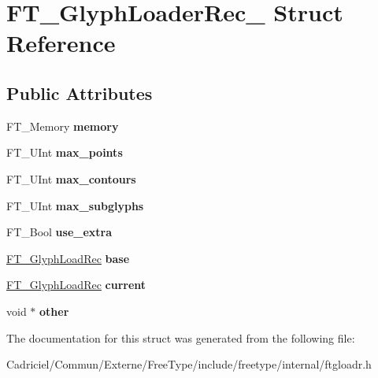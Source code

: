 \hypertarget{struct_f_t___glyph_loader_rec__}{\section{F\-T\-\_\-\-Glyph\-Loader\-Rec\-\_\- Struct Reference}
\label{struct_f_t___glyph_loader_rec__}
}
\subsection*{Public Attributes}
\begin{DoxyCompactItemize}
\item 
\hypertarget{struct_f_t___glyph_loader_rec___a9120a7808ee59d24dd52409e609907a2}{F\-T\-\_\-\-Memory {\bfseries memory}}\label{struct_f_t___glyph_loader_rec___a9120a7808ee59d24dd52409e609907a2}

\item 
\hypertarget{struct_f_t___glyph_loader_rec___a62339fa7a06e0b4ddecd5db2aa606741}{F\-T\-\_\-\-U\-Int {\bfseries max\-\_\-points}}\label{struct_f_t___glyph_loader_rec___a62339fa7a06e0b4ddecd5db2aa606741}

\item 
\hypertarget{struct_f_t___glyph_loader_rec___a808ccf46597572d953f387e705f10a36}{F\-T\-\_\-\-U\-Int {\bfseries max\-\_\-contours}}\label{struct_f_t___glyph_loader_rec___a808ccf46597572d953f387e705f10a36}

\item 
\hypertarget{struct_f_t___glyph_loader_rec___a2d5b00d7caf624ed2b4f6fd2db3228db}{F\-T\-\_\-\-U\-Int {\bfseries max\-\_\-subglyphs}}\label{struct_f_t___glyph_loader_rec___a2d5b00d7caf624ed2b4f6fd2db3228db}

\item 
\hypertarget{struct_f_t___glyph_loader_rec___a54009985acda32d83f2f124e28c5d00a}{F\-T\-\_\-\-Bool {\bfseries use\-\_\-extra}}\label{struct_f_t___glyph_loader_rec___a54009985acda32d83f2f124e28c5d00a}

\item 
\hypertarget{struct_f_t___glyph_loader_rec___ae80dfc17f20bfce8c60ffaaba95c821b}{\hyperlink{struct_f_t___glyph_load_rec__}{F\-T\-\_\-\-Glyph\-Load\-Rec} {\bfseries base}}\label{struct_f_t___glyph_loader_rec___ae80dfc17f20bfce8c60ffaaba95c821b}

\item 
\hypertarget{struct_f_t___glyph_loader_rec___a271b1b9604746ed08cf6613710ebb4c1}{\hyperlink{struct_f_t___glyph_load_rec__}{F\-T\-\_\-\-Glyph\-Load\-Rec} {\bfseries current}}\label{struct_f_t___glyph_loader_rec___a271b1b9604746ed08cf6613710ebb4c1}

\item 
\hypertarget{struct_f_t___glyph_loader_rec___a9c58c5b06f0135fe5cef16bd85d939e3}{void $\ast$ {\bfseries other}}\label{struct_f_t___glyph_loader_rec___a9c58c5b06f0135fe5cef16bd85d939e3}

\end{DoxyCompactItemize}


The documentation for this struct was generated from the following file\-:\begin{DoxyCompactItemize}
\item 
Cadriciel/\-Commun/\-Externe/\-Free\-Type/include/freetype/internal/ftgloadr.\-h\end{DoxyCompactItemize}
